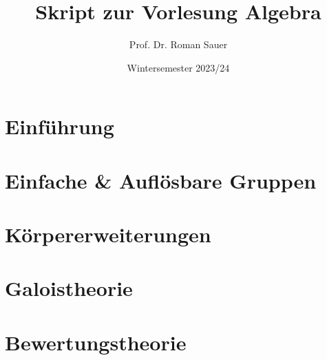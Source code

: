 \documentclass[11pt,a4paper]{article}
\title{Skript zur Vorlesung Algebra}
\author{Prof. Dr. Roman Sauer}
\date{Wintersemester 2023/24}
\theoremstyle{definition}
\theoremstyle{remark}
\begin{document}
\maketitle
\tableofcontents

\newpage

\section*{Einführung}



\newpage

\section{Einfache \& Auflösbare Gruppen}



\section{Körpererweiterungen}



\section{Galoistheorie}


\section{Bewertungstheorie}


\end{document}
